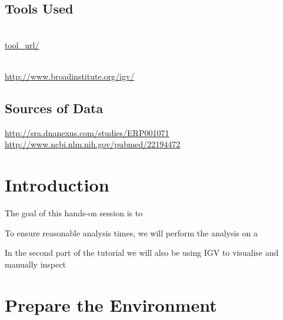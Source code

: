 \subsection{Tools Used}

\begin{description}[style=multiline,labelindent=0cm,align=left,leftmargin=1cm]
  \item[tool name] \hfill\\
    \url{tool_url/}
  \item[IGV] \hfill\\
    \url{http://www.broadinstitute.org/igv/}
\end{description}


\subsection{Sources of Data}

\url{http://sra.dnanexus.com/studies/ERP001071}\\
\url{http://www.ncbi.nlm.nih.gov/pubmed/22194472}


\newpage


\section{Introduction}

The goal of this hands-on session is to 

To ensure reasonable analysis times, we will perform the analysis on a 

In the second part of the tutorial we will also be using IGV to visualise and manually inspect 


\section{Prepare the Environment}

